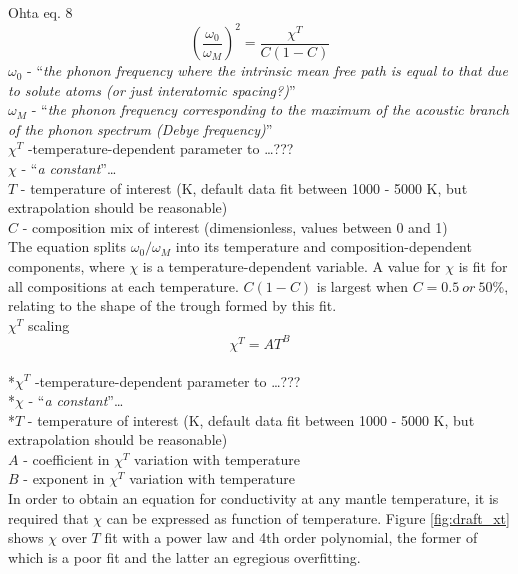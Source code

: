Ohta eq. 8 
\begin{equation}%
\left ( \frac{\omega_{0}}{\omega_{M}} \right )^{2}=\frac{\chi^{T}}{C\left ( 1-C \right )}  
\label{eq.ohta8}
\end{equation}%
$\omega_{0}$ - \enquote{\textit{the phonon frequency where the intrinsic mean free path is equal to that due to solute atoms (or just interatomic spacing?)}}\\
$\omega_{M}$ - \enquote{\textit{the phonon frequency corresponding to the maximum of the acoustic branch of the phonon spectrum (Debye frequency)}}\\
$\chi^{T}$ -temperature-dependent parameter to \dots ??? \\
$\chi$ - \enquote{\textit{a constant}}\dots\\
$T$ - temperature of interest (K, default data fit between 1000 - 5000 K, but extrapolation should be reasonable)\\                    
$C$ - composition mix of interest (dimensionless, values between 0 and 1)\\

The equation splits $\omega_{0}/\omega_{M}$ into its temperature and composition-dependent components, where $\chi$ is a temperature-dependent variable. A value for $\chi$ is fit for all compositions at each temperature. $C\left ( 1-C \right )$ is largest when $C=0.5\ or\ 50\%$, relating to the shape of the trough formed by this fit.\\

$\chi^{T}$ scaling 
\begin{equation}%
\chi^{T}=A T^{B}
\label{eq.chi_scale}
\end{equation}%
\\ *$\chi^{T}$ -temperature-dependent parameter to \dots ??? \\
*$\chi$ - \enquote{\textit{a constant}}\dots\\
*$T$ - temperature of interest (K, default data fit between 1000 - 5000 K, but extrapolation should be reasonable)\\                    
$A$ - coefficient in $\chi^{T}$ variation with temperature\\
$B$ - exponent in $\chi^{T}$ variation with temperature\\

In order to obtain an equation for conductivity at any mantle temperature, it is required that $\chi$ can be expressed as function of temperature. Figure \ref{fig:draft_xt} shows $\chi$ over $T$ fit with a power law and 4th order polynomial, the former of which is a poor fit and the latter an egregious overfitting. 

